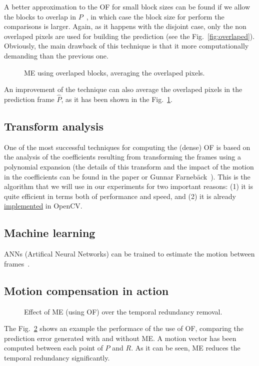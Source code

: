 A better approximation to the OF for small block sizes can be found if
we allow the blocks to overlap in $P$~\cite{orchard1994overlapped}, in
which case the block size for perform the comparisons is
larger. Again, as it happens with the disjoint case, only the non
overlaped pixels are used for building the prediction (see the
Fig.~\ref{fig:overlaped}). Obviously, the main drawback of this
technique is that it more computationally demanding than the previous
one.

\begin{figure}
  \centering
  \caption{ME using overlaped blocks, averaging the overlaped pixels.}
  \label{fig:average}
\end{figure}

An improvement of the technique can also average the overlaped pixels
in the prediction frame $\hat{P}$, as it has been shown in the
Fig.~\ref{fig:average}.

\subsection{Transform analysis}
One of the most successful techniques for computing the (dense)
OF is based on the analysis of the coefficients resulting
from transforming the frames using a polynomial expansion (the details
of this transform and the impact of the motion in the coefficients can
be found in the paper or Gunnar
Farneb{\"a}ck~\cite{farneback2003two}). This is the algorithm that we
will use in our experiments for two important reasons: (1) it is quite
efficient in terms both of performance and speed, and (2) it is
already
\href{https://docs.opencv.org/3.4/d4/dee/tutorial_optical_flow.html}{implemented}
in OpenCV.

\subsection{Machine learning}
ANNs (Artifical Neural Networks) can be trained to estimate the
motion between frames~\cite{dosovitskiy2015flownet}.

\subsection{Motion compensation in action}
\begin{figure}
  \caption{Effect of ME (using OF) over the temporal redundancy
    removal.}
  \label{fig:MC}
\end{figure}
The Fig.~\ref{fig:MC} shows an example the performace of the use of
OF, comparing the prediction error generated with and without ME. A
motion vector has been computed between each point of $P$ and $R$. As
it can be seen, ME reduces the temporal redundancy significantly.

